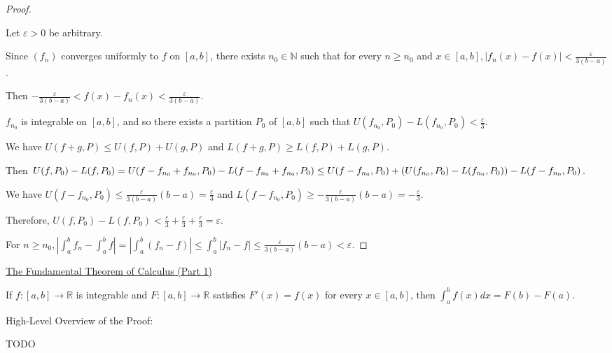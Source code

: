 \documentclass[12pt]{article}
\newcommand{\RR}{\mathbb{R}} %
\newcommand{\NN}{\mathbb{N}}
\newcommand\abs[1]{\left| #1 \right|} %
\newcommand{\eps}{\varepsilon}
\begin{document}
\begin{proof}
$ $

Let $\eps > 0$ be arbitrary.

Since $(f_n)$ converges uniformly to $f$ on $[a, b]$, there exists $n_0 \in \NN$ such that for every $n \ge n_0$ and $x \in [a, b], \abs{f_n(x) - f(x)} < \frac{\eps}{3(b - a)}$.

Then $-\frac{\eps}{3(b - a)} < f(x) - f_n(x) < \frac{\eps}{3(b - a)}$.

$f_{n_0}$ is integrable on $[a, b]$, and so there exists a partition $P_0$ of $[a, b]$ such that $U(f_{n_0}, P_0) - L(f_{n_0}, P_0) < \frac{\eps}{3}$.

We have $U(f + g, P) \le U(f, P) + U(g, P)$ and $L(f + g, P) \ge L(f, P) + L(g, P)$.

Then $U(f, P_0) - L(f, P_0) = U(f - f_{n_0} + f_{n_0}, P_0) - L(f - f_{n_0} + f_{n_0}, P_0)
\\
\le U(f - f_{n_0}, P_0) + (U(f_{n_0}, P_0) - L(f_{n_0}, P_0)) - L(f - f_{n_0}, P_0)$.

We have $U(f - f_{n_0}, P_0) \le \frac{\eps}{3(b - a)} (b - a) = \frac{\eps}{3}$ and $L(f - f_{n_0}, P_0) \ge -\frac{\eps}{3(b - a)} (b - a) = -\frac{\eps}{3}$.

Therefore, $U(f, P_0) - L(f, P_0) < \frac{\eps}{3} + \frac{\eps}{3} + \frac{\eps}{3} = \eps$.

For $n \ge n_0, \abs{\int_a^b f_n - \int_a^b f} = \abs{\int_a^b (f_n - f)} \le \int_a^b \abs{f_n - f} \le \frac{\eps}{3(b - a)} (b - a) < \eps$.
\end{proof}

\pagebreak

\underline{The Fundamental Theorem of Calculus (Part 1)}

If $f : [a, b] \rightarrow \RR$ is integrable and $F : [a, b] \rightarrow \RR$ satisfies $F'(x) = f(x)$ for every $x \in [a, b]$, then $\int_a^b f(x) dx = F(b) - F(a)$.

\dotfill

High-Level Overview of the Proof:

TODO

\dotfill
\end{document}

